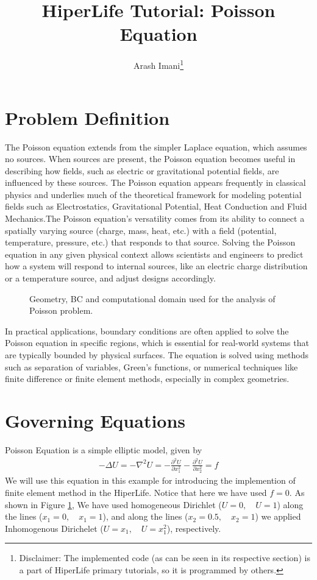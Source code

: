 \documentclass[]{article}
\begin{document}
\title{HiperLife Tutorial: Poisson Equation}
\author{Arash Imani\thanks{Disclaimer: The implemented code (as can be seen in its respective section) is a part of HiperLife primary tutorials, so it is programmed by others.}}
\maketitle

\linenumbers
\section{Problem Definition} \label{sec: pd}
The Poisson equation extends from the simpler Laplace equation, which assumes no sources. When sources are present, the Poisson equation becomes useful in describing how fields, such as electric or gravitational potential fields, are influenced by these sources. The Poisson equation appears frequently in classical physics and underlies much of the theoretical framework for modeling potential fields such as Electrostatics, Gravitational Potential, Heat Conduction and Fluid Mechanics.The Poisson equation's versatility comes from its ability to connect a spatially varying source (charge, mass, heat, etc.) with a field (potential, temperature, pressure, etc.) that responds to that source. Solving the Poisson equation in any given physical context allows scientists and engineers to predict how a system will respond to internal sources, like an electric charge distribution or a temperature source, and adjust designs accordingly.
\begin{figure}[htbp]
	\centering
	
	\caption{Geometry, BC and computational domain used for the analysis of Poisson problem.}
	\label{fig_SB}
\end{figure}

In practical applications, boundary conditions are often applied to solve the Poisson equation in specific regions, which is essential for real-world systems that are typically bounded by physical surfaces. The equation is solved using methods such as separation of variables, Green's functions, or numerical techniques like finite difference or finite element methods, especially in complex geometries.
\section{Governing Equations} \label{sec: ge}
Poisson Equation is a simple elliptic model, given by
\begin{equation}\label{eq1}
	\begin{aligned}
		-\Delta U = -\nabla^2 U = -\frac{\partial^2 U}{\partial x_{1}^2} - 
		\frac{\partial^2 U}{\partial x_{2}^2}=f
	\end{aligned}
\end{equation}
We will use this equation in this example for introducing the implemention of finite
element method in the HiperLife. Notice that here we have used $f = 0$. As shown in Figure \ref{fig_SB}, We have used homogeneous Dirichlet ($U=0 ,\quad U=1$) along the lines ($x_{1}=0,\quad x_{1}=1$), and along the lines ($x_{2}=0.5,\quad x_{2}=1$) we applied Inhomogenous Dirichelet ($U=x_{1} ,\quad U=x_{1}^2$), respectively.
\end{document}
